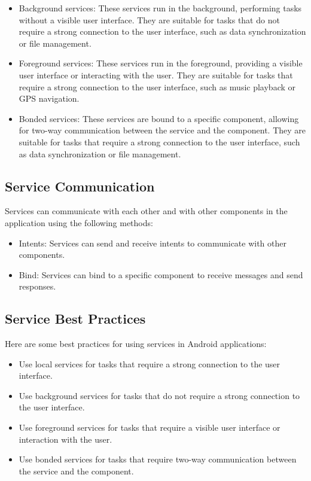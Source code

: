 \documentclass{article}
\begin{document}
\begin{itemize}
\item Background services: These services run in the background, performing tasks without a visible user interface. They are suitable for tasks that do not require a strong connection to the user interface, such as data synchronization or file management.
\item Foreground services: These services run in the foreground, providing a visible user interface or interacting with the user. They are suitable for tasks that require a strong connection to the user interface, such as music playback or GPS navigation.
\item Bonded services: These services are bound to a specific component, allowing for two-way communication between the service and the component. They are suitable for tasks that require a strong connection to the user interface, such as data synchronization or file management.
\end{itemize}

\subsection{Service Communication}
Services can communicate with each other and with other components in the application using the following methods:

\begin{itemize}
\item Intents: Services can send and receive intents to communicate with other components.
\item Bind: Services can bind to a specific component to receive messages and send responses.
\end{itemize}

\subsection{Service Best Practices}
Here are some best practices for using services in Android applications:

\begin{itemize}
\item Use local services for tasks that require a strong connection to the user interface.
\item Use background services for tasks that do not require a strong connection to the user interface.
\item Use foreground services for tasks that require a visible user interface or interaction with the user.
\item Use bonded services for tasks that require two-way communication between the service and the component.
\end{itemize}
\end{document}
